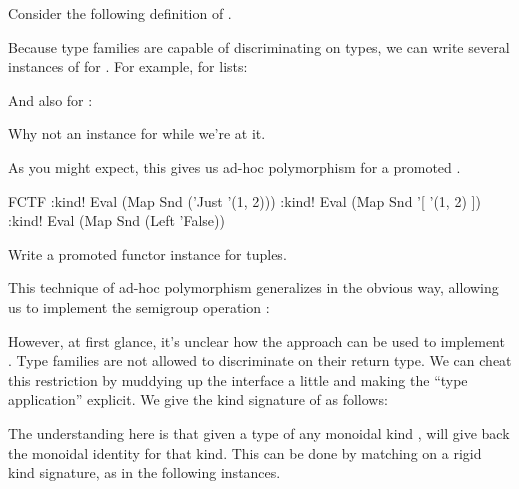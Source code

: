 \documentclass[book.tex]{subfiles}
\begin{document}
Consider the following definition of .


Because type families are capable of discriminating on types, we can write
several instances of  for . For example, for lists:


And also for :


Why not an instance for  while we're at it.


As you might expect, this gives us ad-hoc polymorphism for a promoted .

\begin{dorepl}{FCTF}
:kind! Eval (Map Snd ('Just '(1, 2)))
:kind! Eval (Map Snd '[ '(1, 2) ])
:kind! Eval (Map Snd (Left 'False))
\end{dorepl}

\begin{exercise}
Write a promoted functor instance for tuples.
\end{exercise}
\begin{solution}
\end{solution}

This technique of ad-hoc polymorphism generalizes in the obvious way, allowing
us to implement the semigroup operation :


However, at first glance, it's unclear how the approach can be used to implement
. Type families are not allowed to discriminate on their return type.
We can cheat this restriction by muddying up the interface a little and making
the ``type application'' explicit. We give the \gls{kind signature} of
 as follows:


The understanding here is that given a type of any monoidal kind ,
 will give back the monoidal identity for that kind. This can be done
by matching on a rigid kind signature, as in the following instances.

\end{document}
